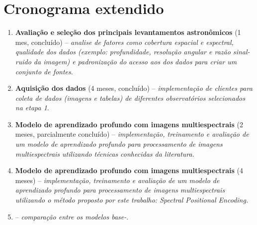 \section{Cronograma extendido}
\label{sec:cronograma-extendido}
\begin{enumerate}
  \item \textbf{Avaliação e seleção dos principais levantamentos astronômicos} (1 mes, concluído) -- \textit{analise de fatores como cobertura espacial e espectral, qualidade dos dados (exemplo: profundidade, resolução angular e razão sinal-ruido da imagem) e padronização do acesso aos dos dados para criar um conjunto de fontes}.
  \item \textbf{Aquisição dos dados} (4 meses, concluído) -- \textit{implementação de clientes para coleta de dados (imagens e tabelas) de diferentes observatórios selecionados na etapa 1}.
  \item \textbf{Modelo de aprendizado profundo com imagens multiespectrais} (2 meses, parcialmente concluído) -- \textit{implementação, treinamento e avaliação de um modelo de aprendizado profundo para processamento de imagens multiespectrais utilizando técnicas conhecidas da literatura.}
  \item \textbf{Modelo de aprendizado profundo com imagens multiespectrais} (4 meses) -- \textit{implementação, treinamento e avaliação de um modelo de aprendizado profundo para processamento de imagens multiespectrais utilizando o método proposto por este trabalho: Spectral Positional Encoding.}
  \item \textbf{} -- \textit{comparação entre os modelos base-}.
\end{enumerate}


\chaptersep
